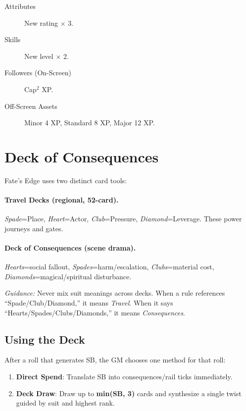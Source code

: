 \begin{description}
\item[Attributes] New rating $\times$ 3.
\item[Skills] New level $\times$ 2.
\item[Followers (On-Screen)] Cap$^2$ XP.
\item[Off-Screen Assets] Minor 4 XP, Standard 8 XP, Major 12 XP.
\end{description}

\section{Deck of Consequences}

Fate's Edge uses two distinct card tools:

\paragraph{Travel Decks (regional, 52-card).}
\emph{Spade}=Place, \emph{Heart}=Actor, \emph{Club}=Pressure, \emph{Diamond}=Leverage. These power journeys and gates.

\paragraph{Deck of Consequences (scene drama).}
\emph{Hearts}=social fallout, \emph{Spades}=harm/escalation, \emph{Clubs}=material cost, \emph{Diamonds}=magical/spiritual disturbance.

\textit{Guidance:} Never mix suit meanings across decks. When a rule references ``Spade/Club/Diamond,'' it means \emph{Travel}. When it says ``Hearts/Spades/Clubs/Diamonds,'' it means \emph{Consequences}.

\subsection{Using the Deck}

After a roll that generates SB, the GM chooses one method for that roll:
\begin{enumerate}
  \item \textbf{Direct Spend}: Translate SB into consequences/rail ticks immediately.
  \item \textbf{Deck Draw}: Draw up to \textbf{min(SB, 3)} cards and synthesize a single twist guided by suit and highest rank.
\end{enumerate}

